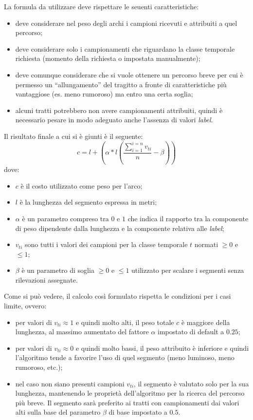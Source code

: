 La formula da utilizzare deve rispettare le seuenti caratteristiche:
\begin{itemize}
\item deve considerare nel peso degli archi i campioni ricevuti e attribuiti a quel percorso;
\item deve considerare solo i campionamenti che riguardano la classe temporale richiesta (momento della richiesta o impostata manualmente);
\item deve comunque considerare che si vuole ottenere un percorso breve per cui è permesso un ``allungamento'' del tragitto a fronte di caratteristiche più vantaggiose (es. meno rumoroso) ma entro una certa soglia;
\item alcuni tratti potrebbero non avere campionamenti attribuiti, quindi è necessario pesare in modo adeguato anche l'assenza di valori \emph{label}. 
\end{itemize}
Il risultato finale a cui si è giunti è il seguente:
$$ c=l+(\alpha * l (\frac{\sum\limits_{i=1}^{i=n}v_{ti}}{n}-\beta)) $$
dove:
\begin{itemize}
\item $c$ è il costo utilizzato come peso per l'arco;
\item $l$ è la lunghezza del segmento espressa in metri;
\item $\alpha$ è un parametro compreso tra $0$ e $1$ che indica il rapporto tra la componente di peso dipendente dalla lunghezza e la componente relativa alle \emph{label};
\item $v_{ti}$ sono tutti i valori dei campioni per la classe temporale $t$ normati $\geq0$ e $\leq1$;
\item $\beta$ è un parametro di soglia $\geq0$ e $\leq1$ utilizzato per scalare i segmenti senza rilevazioni assegnate.
\end{itemize}

Come si può vedere, il calcolo così formulato rispetta le condizioni per i casi limite, ovvero:
\begin{itemize}
\item per valori di $v_{ti} \approx 1$ e quindi molto alti, il peso totale $c$ è maggiore della lunghezza, al massimo aumentato del fattore $\alpha$ impostato di default a $0.25$;
\item per valori di $v_{ti} \approx 0$ e quindi molto bassi, il peso attribuito è inferiore e quindi l'algoritmo tende a favorire l'uso di quel segmento (meno luminoso, meno rumoroso, etc.);
\item nel caso non siano presenti campioni $v_{ti}$, il segmento è valutato solo per la sua lunghezza, mantenendo le proprietà dell'algoritmo per la ricerca del percorso più breve. Il segmento sarà preferito ai tratti con campionamenti dai valori alti sulla base del parametro $\beta$ di base impostato a $0.5$.
\end{itemize}

